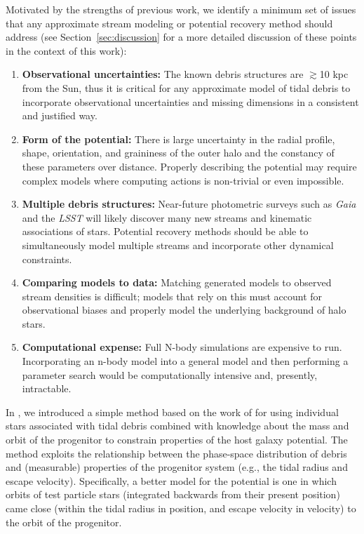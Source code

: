 \documentclass[letterpaper,12pt,preprint]{aastex}
\newcommand{\project}[1]{\textsl{#1}}
\newcommand{\gaia}{\project{Gaia}}
\begin{document}
Motivated by the strengths of previous work, we identify a minimum set of issues that any approximate stream modeling or potential recovery method should address (see Section~\ref{sec:discussion} for a more detailed discussion of these points in the context of this work):
\begin{enumerate}
	\item \textbf{Observational uncertainties:} The known debris structures are $\gtrsim$10 kpc from the Sun, thus it is critical for any approximate model of tidal debris to incorporate observational uncertainties and missing dimensions in a consistent and justified way. 
	\item \textbf{Form of the potential:} There is large uncertainty in the radial profile, shape, orientation, and graininess of the outer halo and the constancy of these parameters over distance. Properly describing the potential may require complex models where computing actions is non-trivial or even impossible.
	\item \textbf{Multiple debris structures:} Near-future photometric surveys such as \gaia\, and the \project{LSST} will likely discover many new streams and kinematic associations of stars. Potential recovery methods should be able to simultaneously model multiple streams and incorporate other dynamical constraints.
	\item \textbf{Comparing models to data:} Matching generated models to observed stream densities is difficult; models that rely on this must account for observational biases and properly model the underlying background of halo stars. 
	\item \textbf{Computational expense:} Full N-body simulations are expensive to run. Incorporating an n-body model into a general model and then performing a parameter search would be computationally intensive and, presently, intractable. 
\end{enumerate}

In \citet{apw13}, we introduced a simple method based on the work of \citet{johnston99a} for using individual stars associated with tidal debris combined with knowledge about the mass and orbit of the progenitor to constrain properties of the host galaxy potential. The method exploits the relationship between the phase-space distribution of debris and (measurable) properties of the progenitor system (e.g., the tidal radius and escape velocity).  Specifically, a better model for the potential is one in which orbits of test particle stars (integrated backwards from their present position) came close (within the tidal radius in position, and escape velocity in velocity) to the orbit of the progenitor. 
\end{document}
